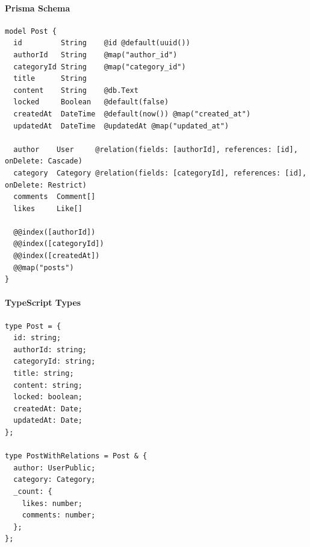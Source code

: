 \documentclass[11pt,a4paper]{article}
\begin{document}
\paragraph{Prisma Schema}
\begin{lstlisting}
model Post {
  id         String    @id @default(uuid())
  authorId   String    @map("author_id")
  categoryId String    @map("category_id")
  title      String
  content    String    @db.Text
  locked     Boolean   @default(false)
  createdAt  DateTime  @default(now()) @map("created_at")
  updatedAt  DateTime  @updatedAt @map("updated_at")
  
  author    User     @relation(fields: [authorId], references: [id], onDelete: Cascade)
  category  Category @relation(fields: [categoryId], references: [id], onDelete: Restrict)
  comments  Comment[]
  likes     Like[]
  
  @@index([authorId])
  @@index([categoryId])
  @@index([createdAt])
  @@map("posts")
}
\end{lstlisting}

\paragraph{TypeScript Types}
\begin{lstlisting}
type Post = {
  id: string;
  authorId: string;
  categoryId: string;
  title: string;
  content: string;
  locked: boolean;
  createdAt: Date;
  updatedAt: Date;
};

type PostWithRelations = Post & {
  author: UserPublic;
  category: Category;
  _count: {
    likes: number;
    comments: number;
  };
};
\end{lstlisting}
\end{document}
